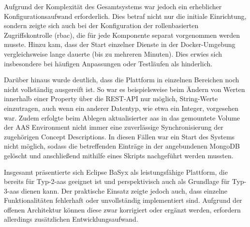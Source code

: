 Aufgrund der Komplexität des Gesamtsystems war jedoch ein erheblicher Konfigurationsaufwand erforderlich.
Dies betraf nicht nur die initiale Einrichtung, sondern zeigte sich auch bei der Konfiguration der rollenbasierten Zugriffskontrolle (\acs{rbac}), die für jede Komponente separat vorgenommen werden musste.
Hinzu kam, dass der Start einzelner Dienste in der Docker-Umgebung vergleichsweise lange dauerte (bis zu mehreren Minuten).
Dies erwies sich insbesondere bei häufigen Anpassungen oder Testläufen als hinderlich.

Darüber hinaus wurde deutlich, dass die Plattform in einzelnen Bereichen noch nicht vollständig ausgereift ist.
So war es beispielsweise beim Ändern von Werten innerhalb einer Property über die REST-API nur möglich, String-Werte einzutragen, auch wenn ein anderer Datentyp, wie etwa ein Integer, vorgesehen war.
Zudem erfolgte beim Ablegen aktualisierter \acs{aas} in das gemountete Volume der AAS Environment nicht immer eine zuverlässige Synchronisierung der zugehörigen Concept Descriptions.
In diesen Fällen war ein Start des Systems nicht möglich, sodass die betreffenden Einträge in der angebundenen MongoDB gelöscht und anschließend mithilfe eines Skripts nachgeführt werden mussten.

Insgesamt präsentierte sich Eclipse BaSyx als leistungsfähige Plattform, die bereits für Typ-2-\acs{aas} geeignet ist und perspektivisch auch als Grundlage für Typ-3-\acs{aas} dienen kann.
Der praktische Einsatz zeigte jedoch auch, dass einzelne Funktionalitäten fehlerhaft oder unvollständig implementiert sind.
Aufgrund der offenen Architektur können diese zwar korrigiert oder ergänzt werden, erfordern allerdings zusätzlichen Entwicklungsaufwand.









